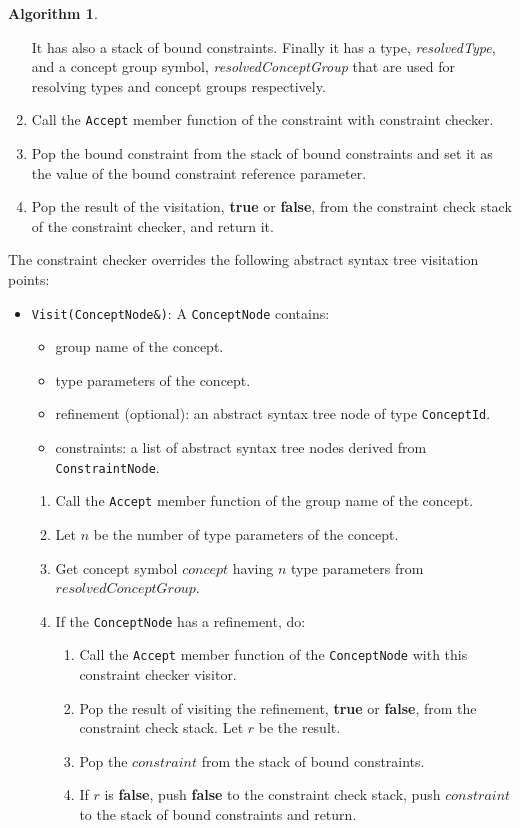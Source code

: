 \documentclass[a4paper,oneside,11pt]{book}
\theoremstyle{definition}
\newtheorem{algo}{Algorithm}[section]
\begin{document}
\begin{algo}
\begin{enumerate}
It has also a stack of bound constraints.
Finally it has a type, \emph{resolvedType}, and a concept group symbol, \emph{resolvedConceptGroup}
that are used for resolving types and concept groups respectively.
\item
Call the \verb|Accept| member function of the constraint with constraint checker.
\item
Pop the bound constraint from the stack of bound constraints and set it as the value of the bound constraint reference parameter.
\item
Pop the result of the visitation, \textbf{true} or \textbf{false}, from the constraint check stack of the constraint checker, and return it.
\end{enumerate}
The constraint checker overrides the following abstract syntax tree visitation points:
\begin{itemize}
\item
\verb|Visit(ConceptNode&)|:
A \verb|ConceptNode| contains:
\begin{itemize}
\item
group name of the concept.
\item
type parameters of the concept.
\item
refinement (optional): an abstract syntax tree node of type \verb|ConceptId|.
\item
constraints: a list of abstract syntax tree nodes derived from \verb|ConstraintNode|.
\end{itemize}
\begin{enumerate}
\item
Call the \verb|Accept| member function of the group name of the concept.
\item
Let $n$ be the number of type parameters of the concept.
\item
Get concept symbol $concept$ having $n$ type parameters from $resolvedConceptGroup$.
\item
If the \verb|ConceptNode| has a refinement, do:
\begin{enumerate}
\item
Call the \verb|Accept| member function of the \verb|ConceptNode| with this constraint checker visitor.
\item
Pop the result of visiting the refinement, \textbf{true} or \textbf{false}, from the constraint check stack. Let $r$ be the result.
\item
Pop the $constraint$ from the stack of bound constraints.
\item
If $r$ is \textbf{false}, push \textbf{false} to the constraint check stack, push $constraint$ to the stack of bound constraints and return.

\end{enumerate}
\end{enumerate}
\end{itemize}
\end{algo}
\end{document}
